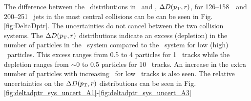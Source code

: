 The difference between the \Dptr\ distributions in \pp\ and \pbpb, $\Delta\mbox{$D( p_{\mathrm{T}}, r)$}$, for 126--158~\GeV\  and 200--251 \GeV\ jets in the most central collisions can be can be seen in Fig.\ref{fig:DeltaDptr}. The uncertainties do not cancel between the two collision systems.
The $\Delta\mbox{$D( p_{\mathrm{T}}, r)$}$ distributions indicate an excess (depletion) in the number of particles in the \pbpb\ system compared to the \pp\ system for low (high) \pt\ particles. This excess ranges from 0.5 to 4 particles for 1 \GeV\ tracks while the depletion ranges from $\sim$0 to 0.5 particles for 10 \GeV\ tracks. An increase in the extra number of particles with increasing \ptjet\ for low \pt\ tracks is also seen. The relative uncertainties on the $\Delta\mbox{$D( p_{\mathrm{T}}, r)$}$ distributions can be seen in Fig.\ref{fig:deltadptr_sys_uncert_A1}-\ref{fig:deltadptr_sys_uncert_A3}


